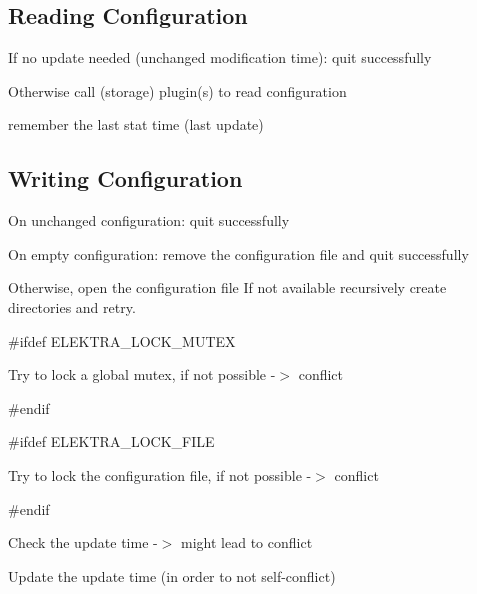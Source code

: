 \subsection*{Reading Configuration}


\begin{DoxyEnumerate}
\item If no update needed (unchanged modification time)\+: quit successfully
\item Otherwise call (storage) plugin(s) to read configuration
\item remember the last stat time (last update)
\end{DoxyEnumerate}

\subsection*{Writing Configuration}


\begin{DoxyEnumerate}
\item On unchanged configuration\+: quit successfully
\item On empty configuration\+: remove the configuration file and quit successfully
\item Otherwise, open the configuration file If not available recursively create directories and retry.
\end{DoxyEnumerate}

\#ifdef E\+L\+E\+K\+T\+R\+A\+\_\+\+L\+O\+C\+K\+\_\+\+M\+U\+T\+EX


\begin{DoxyEnumerate}
\item Try to lock a global mutex, if not possible -\/$>$ conflict
\end{DoxyEnumerate}

\#endif

\#ifdef E\+L\+E\+K\+T\+R\+A\+\_\+\+L\+O\+C\+K\+\_\+\+F\+I\+LE


\begin{DoxyEnumerate}
\item Try to lock the configuration file, if not possible -\/$>$ conflict
\end{DoxyEnumerate}

\#endif


\begin{DoxyEnumerate}
\item Check the update time -\/$>$ might lead to conflict
\item Update the update time (in order to not self-\/conflict)
\end{DoxyEnumerate}

